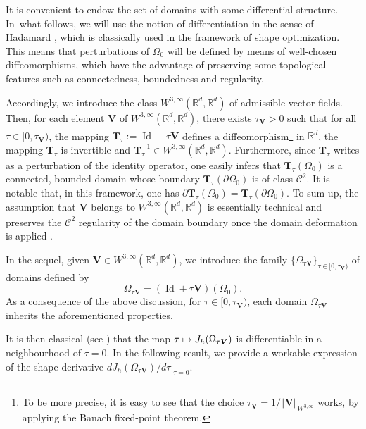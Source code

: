 \documentclass[JEP,XML,SOM,Unicode,NoFloatCountersInSection]{cedram}
\newcommand\mto{\mathchoice{\longmapsto}{\mapsto}{\mapsto}{\mapsto}}
\newcommand{\bT}{\boldsymbol{T}}
\newcommand{\bV}{\boldsymbol{V}}
\DeclareMathOperator{\Id}{Id}
\newcommand\R{{\mathbb R}}
\theoremstyle{definition}
\begin{document}
It is convenient to endow the set of domains with some differential structure. In~what follows, we will use the notion of differentiation in the sense of Hadamard \cite{Delfour-Zolesio,Henrot-Pierre-2005}, which is classically used in the framework of shape optimization. This means that perturbations of $\Omega_0$ will be defined by means of well-chosen diffeomorphisms, which have the advantage of preserving some topological features such as connectedness, boundedness and regularity.

Accordingly, we introduce the class $W^{3, \infty}(\R^d, \R^d)$ of admissible vector fields. Then, for each element $\bV$ of $W^{3,\infty}(\R^d, \R^d)$, there exists $\tau_{\bV}>0$ such that for all $\tau\in [0,\tau_{\bV})$, the mapping $\bT_\tau:=\Id+\tau\bV$ defines a diffeomorphism\footnote{To be more precise, it is easy to see that the choice $\tau_{\bV}=1/\Vert \bV\Vert_{W^{3,\infty}}$ works, by applying the Banach fixed-point theorem.} in $\R^d$, \ie the mapping $\bT_\tau$ is invertible and $\bT_\tau^{-1}\in W^{3,\infty}(\R^d,\R^d)$.
Furthermore, since $\bT_\tau$ writes as a perturbation of the identity operator, one easily infers that $\bT_\tau(\Omega_0)$ is a connected, bounded domain whose boundary $\bT_\tau(\partial \Omega_0)$ is of class $\mathscr{C}^2$. It is notable that, in this framework, one has $\partial \bT_\tau(\Omega_0)=\bT_\tau(\partial \Omega_0)$. To sum up, the assumption that $\bV$ belongs to $W^{3,\infty}(\R^d, \R^d)$ is essentially technical and preserves the $\mathscr{C}^2$ regularity of the domain boundary once the domain deformation is applied \cite[Chap.\,7]{Delfour-Zolesio}.

In the sequel, given $\bV\in W^{3,\infty}(\R^d, \R^d)$, we introduce the family $\{\Omega_{\tau\bV}\}_{\tau\in [0,\tau_{\bV})}$ of domains defined by
\[
\Omega_{\tau\bV}= (\Id+\tau\bV)(\Omega_0).
\]
As a consequence of the above discussion, for $\tau \in [0,\tau_{\bV})$, each domain $\Omega_{\tau\bV}$ inherits the aforementioned properties.

It is then classical (see \eg \cite[Chap.\,5]{Henrot-Pierre-2005}) that the map $\tau \mto J_h(\Omega_{\tau\bV})$ is differentiable in a neighbourhood of $\tau = 0$. In the following result, we provide a workable expression of the shape derivative $dJ_h(\Omega_{\tau\bV})/d\tau|_{\tau=0}$.
\end{document}
